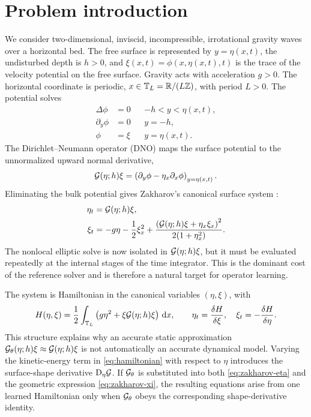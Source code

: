 \section{Problem introduction}
\label{sec:introduction}

We consider two-dimensional, inviscid, incompressible, irrotational gravity
waves over a horizontal bed. The free surface is represented by
$y=\eta(x,t)$, the undisturbed depth is $h>0$, and
$\xi(x,t)=\phi(x,\eta(x,t),t)$ is the trace of the velocity potential on the
free surface. Gravity acts with acceleration $g>0$. The horizontal coordinate
is periodic, $x\in\mathbb{T}_L=\mathbb{R}/(L\mathbb Z)$, with period \(L>0\). The potential
solves
\begin{align}
  \Delta\phi &= 0 && -h<y<\eta(x,t), \\
  \partial_y\phi &= 0 && y=-h, \\
  \phi &= \xi && y=\eta(x,t).
\end{align}
The Dirichlet--Neumann operator (DNO) maps the surface potential to the
unnormalized upward normal derivative,
\begin{equation}
  \mathcal{G}(\eta;h)\xi
  =\left(\partial_y\phi-\eta_x\partial_x\phi\right)_{y=\eta(x,t)}.
  \label{eq:dno-definition}
\end{equation}
Eliminating the bulk potential gives Zakharov's canonical surface system
\cite{zakharov1968,craig1993}:
\begin{align}
  \eta_t &= \mathcal{G}(\eta;h)\xi, \label{eq:zakharov-eta}\\
  \xi_t &=-g\eta-\frac12\xi_x^2
  +\frac{\left(\mathcal{G}(\eta;h)\xi+\eta_x\xi_x\right)^2}
  {2(1+\eta_x^2)}. \label{eq:zakharov-xi}
\end{align}
The nonlocal elliptic solve is now isolated in $\mathcal{G}(\eta;h)\xi$, but it must be
evaluated repeatedly at the internal stages of the time integrator. This is
the dominant cost of the reference solver and is therefore a natural target
for operator learning.

The system is Hamiltonian in the canonical variables $(\eta,\xi)$, with
\begin{equation}
  H(\eta,\xi)
  =\frac12\int_{\mathbb{T}_L}\left(g\eta^2+\xi\mathcal{G}(\eta;h)\xi\right)\,\mathrm{d} x,
  \qquad
  \eta_t=\frac{\delta H}{\delta\xi},\quad
  \xi_t=-\frac{\delta H}{\delta\eta}.
  \label{eq:hamiltonian}
\end{equation}
This structure explains why an accurate static approximation
$\mathcal{G}_{\theta}(\eta;h)\xi\approx\mathcal{G}(\eta;h)\xi$ is not automatically an accurate
dynamical model. Varying the kinetic-energy term in \eqref{eq:hamiltonian}
with respect to $\eta$ introduces the surface-shape derivative
$\mathrm{D}_\eta\mathcal{G}$. If $\mathcal{G}_{\theta}$ is substituted into both
\eqref{eq:zakharov-eta} and the geometric expression
\eqref{eq:zakharov-xi}, the resulting equations arise from one learned
Hamiltonian only when $\mathcal{G}_{\theta}$ obeys the corresponding shape-derivative
identity.

